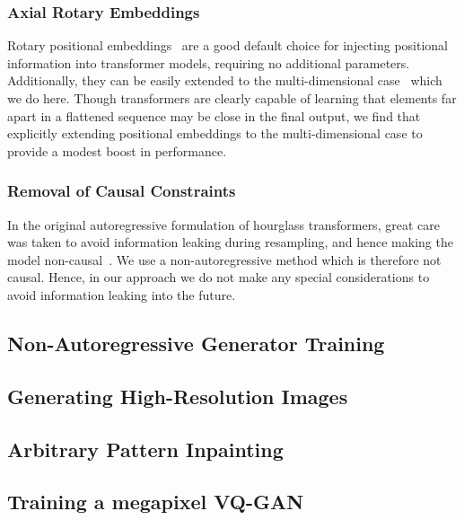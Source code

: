 \subsubsection*{Axial Rotary Embeddings}

Rotary positional embeddings~\cite{su2021roformer} are a good default choice for
injecting positional information into transformer models, requiring no
additional parameters. Additionally, they can be easily extended to the
multi-dimensional case~\cite{rope-eleutherai} which we do here. Though
transformers are clearly capable of learning that elements far apart in a
flattened sequence may be close in the final output, we find that explicitly
extending positional embeddings to the multi-dimensional case to provide a
modest boost in performance.

\subsubsection*{Removal of Causal Constraints}

In the original autoregressive formulation of hourglass transformers, great care
was taken to avoid information leaking during resampling, and hence making the
model non-causal~\cite{nawrot2021hierarchical}. We use a non-autoregressive
method which is therefore not causal. Hence, in our approach we do not make any
special considerations to avoid information leaking into the future.

\subsection{Non-Autoregressive Generator Training}

\subsection{Generating High-Resolution Images}

\subsection{Arbitrary Pattern Inpainting}

\subsection{Training a megapixel VQ-GAN}

\label{sec:megagan}

